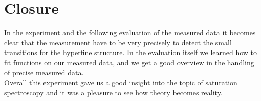 
\chapter{Closure}
\label{chap:close}

In the experiment and the following evaluation of the measured data it becomes clear that the measurement have to be very precisely to detect the small transitions for the hyperfine structure. In the evaluation itself we learned how to fit functions on our measured data, and we get a good overview in the handling of precise measured data.\\
Overall this experiment gave us a good insight into the topic of saturation spectroscopy and it was a pleasure to see how theory becomes reality.
